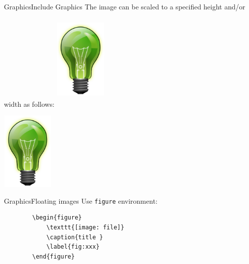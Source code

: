 \documentclass{beamer}
\begin{document}
\begin{darkframes}
\begin{frame}[fragile]{Graphics}{Include Graphics}
	The image can be scaled to a specified height and/or width as follows:
	\texttt{\includegraphics[height=2in,width=1in]{images/bulb}}
	\begin{center}
	\includegraphics[height=1.5in,width=1in]{images/bulb}
	\end{center}
\end{frame}

\begin{frame}[fragile]{Graphics}{Floating images}
	Use \texttt{figure} environment:
	\begin{center}
		\begin{verbatim}
		\begin{figure}
			\texttt{[image: file]}
			\caption{title }
			\label{fig:xxx}
		\end{figure}
	\end{verbatim}
	\end{center}
\end{frame}




\end{darkframes}
\end{document}
